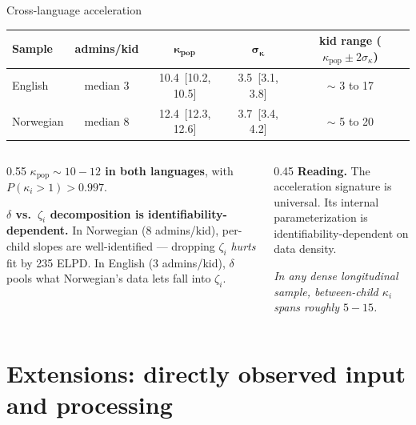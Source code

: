 \documentclass[
  ignorenonframetext,
  aspectratio=169,
  t]{beamer}
\renewcommand{\arraystretch}{1.10}
\begin{document}
\begin{frame}{Cross-language acceleration}
\label{cross-language-acceleration}
\centering
\small
\renewcommand{\arraystretch}{1.20}
\begin{tabular}{@{}lcccc@{}}
\toprule
\textbf{Sample} & \textbf{admins/kid} & $\boldsymbol{\kappa_{\text{pop}}}$ & $\boldsymbol{\sigma_\kappa}$ & \textbf{kid range ($\kappa_{\text{pop}} \pm 2\sigma_\kappa$)} \\
\midrule
English   & median 3 & 10.4 \,[10.2, 10.5] & 3.5 \,[3.1, 3.8] & $\sim$ 3 to 17 \\
Norwegian & median 8 & 12.4 \,[12.3, 12.6] & 3.7 \,[3.4, 4.2] & $\sim$ 5 to 20 \\
\bottomrule
\end{tabular}

\vspace{0.6em}
\footnotesize

\begin{columns}[T]
\begin{column}{0.55\linewidth}
\textbf{\(\kappa_{\text{pop}} \sim 10\!-\!12\) in both languages}, with
\(P(\kappa_i > 1) > 0.997\).

\vspace{0.4em}

\textbf{\(\delta\) vs.~\(\zeta_i\) decomposition is
identifiability-dependent.} In Norwegian (8 admins/kid), per-child
slopes are well-identified --- dropping \(\zeta_i\) \emph{hurts} fit by
235 ELPD. In English (3 admins/kid), \(\delta\) pools what Norwegian's
data lets fall into \(\zeta_i\).
\end{column}

\begin{column}{0.45\linewidth}
\textbf{Reading.} The acceleration signature is universal. Its internal
parameterization is identifiability-dependent on data density.

\vspace{0.4em}

\emph{In any dense longitudinal sample, between-child \(\kappa_i\) spans
roughly \(5\!-\!15\).}
\end{column}
\end{columns}
\end{frame}

\section{Extensions: directly observed input and
processing}\label{extensions-directly-observed-input-and-processing}
\end{document}
